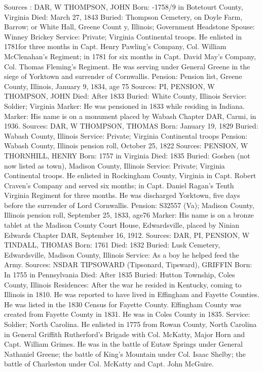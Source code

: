 Sources : DAR, W 
THOMPSON, JOHN 
Born: -1758/9 in Botetourt County, Virginia
Died: March 27, 1843 
Buried: Thompson Cemetery, on Doyle Farm, Barrow; or White Hall, Greene Count y, Illinois; Government Headstone 
Spouse: Winney Brickey 
Service: Private; Virginia Continental troops. He enlisted in 1781for three months in Capt. Henry Pawling's Company, Col. William McClenahan's Regiment; in 1781 for six months in Capt. David May's Company, Col. Thomas Fleming's Regiment. He was serving under General Greene in the siege of Yorktown and surrender of Cornwallis. 
Pension: Pension list, Greene County, Illinois, January 9, 1834, age 75
Sources: PI, PENSION, W 
THOMPSON, JOHN 
Died: After 1833 
Buried: White County, Illinois 
Service: Soldier; Virginia 
Marker: He was pensioned in 1833 while residing in Indiana. 
Marker: His name is on a monument placed by Wabash Chapter DAR, Carmi, in 1936. 
Sources: DAR, W 
THOMPSON, THOMAS 
Born: January 19, 1829 
Buried: Wabash County, Illinois 
Service: Private; Virginia Continental troops 
Pension: Wabash County, Illinois pension roll, October 25, 1822 
Sources: PENSION, W 
THORNHILL, HENRY 
Born: 1757 in Virginia 
Died: 1835 
Buried: Goshen (not now listed as town), Madison County, Illinois 
Service: Private; Virginia Continental troops. He enlisted in Rockingham County, Virginia in Capt. Robert Craven's Company and served six months; in Capt. Daniel Ragan's Tenth Virginia Regiment for three months. He was discharged Yorktown, five days before the surrender of Lord Cornwallis. 
Pension: S32557 (Va); Madison County, Illinois pension roll, September 25, 1833, age76 
Marker: His name is on a bronze tablet at the Madison County Court House, Edwardsville, placed by Ninian Edwards Chapter DAR, September 16, 1912. 
Sources: DAR, PI, PENSION, W 
TINDALL, THOMAS 
Born: 1761 
Died: 1832 
Buried: Lusk Cemetery, Edwardsville, Madison County, Illinois 
Service: As a boy he helped feed the Army. 
Sources: NSDAR 
TIPSOWARD (Tipsonard, Tipsward), GRIFFIN
Born: In 1755 in Pennsylvania
Died: After 1835
Buried: Hutton Township, Coles County, Illinois 
Residences: After the war he resided in Kentucky, coming to Illinois in 1810. He was reported to have lived in Effingham and Fayette Counties. He was listed in the 1830 Census for Fayette County. Effingham County was created from Fayette County in 1831. He was in Coles County in 1835. 
Service: Soldier; North Carolina. He enlisted in 1775 from Rowan County, North Carolina in General Griffith Rutherford's Brigade with Col. McKatty, Major Horn and Capt. William Grimes. He was in the battle of Eutaw Springs under General Nathaniel Greene; the battle of King's Mountain under Col. Isaac Shelby; the battle of Charleston under Col. McKatty and Capt. John McGuire. 
